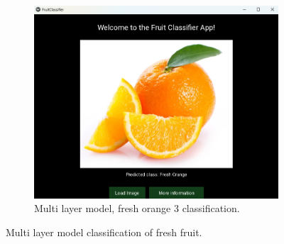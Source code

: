 \documentclass[conference]{IEEEtran}
\begin{document}
\begin{figure}[h]
\begin{subfigure}[b]{0.48\linewidth}
        \centering
        \includegraphics[width=\linewidth]{Mlayer orage3.png}
        \caption{Multi layer model, fresh orange 3 classification.}
        \label{figFB}
    \end{subfigure}
    \caption{Multi layer model classification of fresh fruit.}
    \label{FigMF}
\end{figure}
\end{document}
